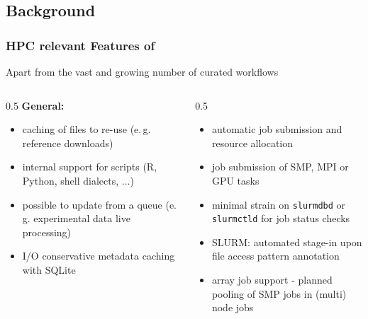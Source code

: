 \subsection{Background}

\begin{frame}
	\frametitle{HPC relevant Features of \Snakemake}
	Apart from the vast and growing number of curated workflows \\
	\vfill
	\begin{columns}[t]
		\begin{column}{0.5\textwidth}
			{\bf General:}
			\begin{itemize}[<+->]
				\item caching of files to re-use (e.\,g. reference downloads)
				\item internal support for scripts (R, Python, shell dialects, $\ldots$)
				\item possible to update from a queue (e.\,g. experimental data live processing)
				\item I/O conservative metadata caching with SQLite
			\end{itemize}
		\end{column}
		\begin{column}{0.5\textwidth}
			\begin{itemize}[<+->]
				\item automatic job submission and resource allocation
				\item job submission of SMP, MPI or GPU tasks
				\item minimal strain on \texttt{slurmdbd} or \texttt{slurmctld} for job status checks
				\item SLURM: automated stage-in upon file access pattern annotation
				\item array job support - planned pooling of SMP jobs in (multi) node jobs
			\end{itemize}
		\end{column}
	\end{columns}
\end{frame}

